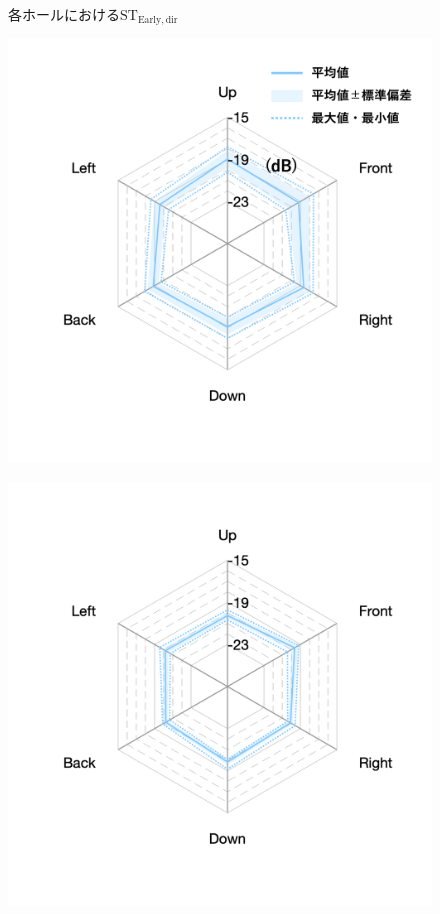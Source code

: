 \documentclass[11pt,a4j]{jreport}
\begin{document}
\begin{figure}[H]
    \caption{各ホールにおける$\mathrm{ST_{Early,dir}}$}
    \label{fig:各ホールにおけるSTEarly}
    \end{figure}


    \begin{figure}[H]
      \begin{minipage}[b]{.33\textwidth}
          \centering
          \includegraphics[width=1\linewidth]{images/realHallDirSt/late_hall_a_withLegend.png}
          \label{fig:ホールAにおけるSTlate}
      \end{minipage}%
      \begin{minipage}[b]{.33\textwidth}
        \centering
        \includegraphics[width=1\linewidth]{images/realHallDirSt/late_hall_b_allpoints.png}

\end{minipage}
\end{figure}
\end{document}
